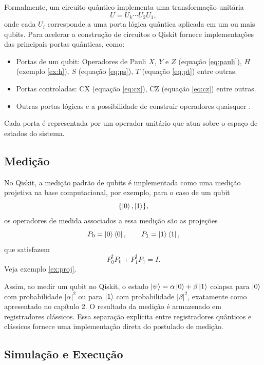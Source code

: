 Formalmente, um circuito quântico implementa uma transformação unitária
$$
U = U_k \cdots U_2 U_1,
$$
onde cada $U_i$ corresponde a uma porta lógica quântica aplicada em um ou mais qubits. Para acelerar a construção de circuitos o Qiskit fornece implementações das principais portas quânticas, como:
\begin{itemize}
    \item Portas de um qubit: Operadores de Pauli $X$, $Y$ e $Z$ (equação \eqref{eq:pauli}), $H$ (exemplo \ref{ex:h}), $S$ (equação \eqref{eq:ps}), $T$ (equação \eqref{eq:pt}) entre outras.
    \item Portas controladas: $\mathrm{CX}$ (equação \eqref{eq:cx}), $\mathrm{CZ}$ (equação \eqref{eq:cz}) entre outras.
    \item Outras portas lógicas \cite{ibm_quantum_circuit_library_2025} e a possibilidade de construir operadores quaisquer \cite{ibm_quantum_operators_overview_2025}.
\end{itemize}
Cada porta é representada por um operador unitário que atua sobre o espaço de estados do sistema.

\subsection{Medição}

No Qiskit, a medição padrão de qubits é implementada como uma medição projetiva na base computacional, por exemplo, para o caso de um qubit 
$$
\{ \ket{0}, \ket{1} \},
$$
os operadores de medida associados a essa medição são as projeções
\[
P_0 = \ket{0}\bra{0}, 
\qquad
P_1 = \ket{1}\bra{1},
\]
que satisfazem
\[
P_0^\dagger P_0 + P_1^\dagger P_1 = I.
\]
Veja exemplo \ref{ex:proj}.

Assim, ao medir um qubit no Qiskit, o estado $\ket{\psi} = \alpha \ket{0} + \beta \ket{1}$ colapsa para $\ket{0}$ com probabilidade $|\alpha|^2$ ou para $\ket{1}$ com probabilidade $|\beta|^2$, exatamente como apresentado no capítulo 2. O resultado da medição é armazenado em registradores clássicos. Essa separação explícita entre registradores quânticos e clássicos fornece uma implementação direta do postulado de medição.

\subsection{Simulação e Execução}

